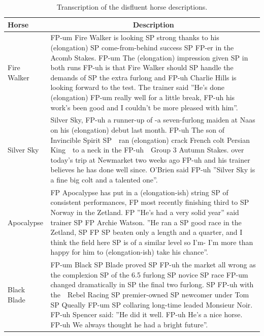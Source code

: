 \documentclass[
  man,floatsintext]{apa7}
\begin{document}
\begin{table}[tbp]

\begin{center}
\begin{threeparttable}

\caption{\label{tab:tab-horse-description-disfluent}Transcription of the disfluent horse descriptions.}

\begin{tabular}{m{2cm}m{13cm}}
\toprule
Horse & \multicolumn{1}{c}{Description}\\
\midrule
Fire Walker & FP-um Fire Walker is looking SP strong thanks to his (elongation) SP come-from-behind success SP FP-er in the Acomb Stakes. FP-um The (elongation) impression given SP in both runs FP-uh is that Fire Walker should SP handle the demands of SP the extra furlong and FP-uh Charlie Hills is looking forward to the test. The trainer said ''He's done (elongation) FP-um really well for a little break, FP-uh his work's been good and I couldn't be more pleased with him''.\\
Silver Sky & Silver Sky, FP-uh a runner-up of -a seven-furlong maiden at Naas on his (elongation) debut last month. FP-uh The son of Invincible Spirit SP\ \ ran (elongation) crack French colt Persian King\ \  to a neck in the FP-uh\ \ Group 3 Autumn Stakes. over today's trip at Newmarket two weeks ago FP-uh and his trainer believes he has done well since. O'Brien said FP-uh ''Silver Sky is a fine big colt and a talented one''.\\
Apocalypse & FP Apocalypse has put in a (elongation-ish) string SP of consistent performances, FP most recently finishing third to SP Norway in the Zetland. FP ''He's had a very solid year'' said trainer SP FP Archie Watson. ''He ran a SP good race in the Zetland, SP FP SP beaten only a length and a quarter, and I think the field here SP is of a similar level so I'm- I'm more than happy for him to (elongation-ish) take his chance''.\\
Black Blade & FP-um Black SP Blade proved SP FP-uh the market all wrong as the complexion SP of the 6.5 furlong SP novice SP race FP-um changed dramatically in SP the final two furlong. SP FP-uh with the\ \ Rebel Racing SP premier-owned SP newcomer under Tom SP Queally FP-um SP collaring long-time leaded Monsieur Noir. FP-uh Spencer said: ''He did it well. FP-uh He's a nice horse. FP-uh We always thought he had a bright future''.\\
\bottomrule
\end{tabular}

\end{threeparttable}
\end{center}

\end{table}
\end{document}

